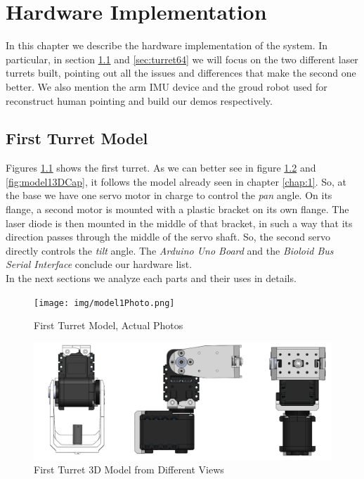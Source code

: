 \chapter{Hardware Implementation}
\label{chap:2}
In this chapter we describe the hardware implementation of the system. In particular, in section \ref{sec:turret12} and \ref{sec:turret64} we will focus on the two different laser turrets built, pointing out all the issues and differences that make the second one better. We also mention the arm IMU device and the groud robot used for reconstruct human pointing and build our demos respectively.
\section{First Turret Model} \label{sec:turret12}
Figures \ref{fig:model1Photo} shows the first turret. As we can better see in figure \ref{fig:model13D} and \ref{fig:model13DCap}, it follows the model already seen in chapter \ref{chap:1}. So, at the base we have one servo motor in charge to control the \emph{pan} angle. On its flange, a second motor is mounted with a plastic bracket on its own flange. The laser diode is then mounted in the middle of that bracket, in such a way that its direction passes through the middle of the servo shaft. So, the second servo directly controls the \emph{tilt} angle. 
The \emph{Arduino Uno Board} and the \emph{Bioloid Bus Serial Interface} conclude our hardware list.
\\In the next sections we analyze each parts and their uses in details.
\begin{figure}
	\centering
	\texttt{[image: img/model1Photo.png]}%
	\caption{First Turret Model, Actual Photos}
	\label{fig:model1Photo}
\end{figure}
\begin{figure}
	\centering
	\includegraphics[width=\textwidth]{img/model13dsides.png}%
	\caption{First Turret 3D Model from Different Views}
	\label{fig:model13D}
\end{figure}
